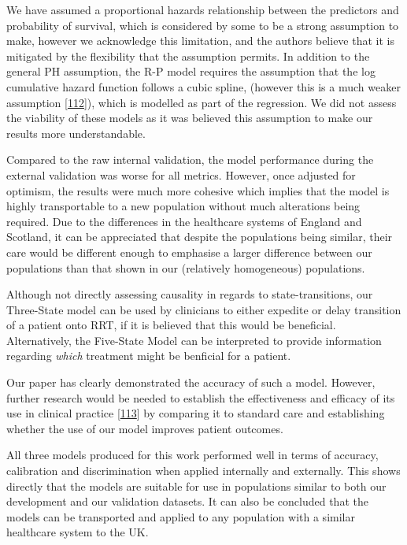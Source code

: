 \documentclass[12pt,PhD,twoside,openright]{muthesis}
\begin{document}
We have assumed a proportional hazards relationship between the predictors and probability of survival, which is considered by some to be a strong assumption to make, however we acknowledge this limitation, and the authors believe that it is mitigated by the flexibility that the assumption permits. In addition to the general PH assumption, the R-P model requires the assumption that the log cumulative hazard function follows a cubic spline, (however this is a much weaker assumption {[}\protect\hyperlink{ref-royston_flexible_2002}{112}{]}), which is modelled as part of the regression. We did not assess the viability of these models as it was believed this assumption to make our results more understandable.

Compared to the raw internal validation, the model performance during the external validation was worse for all metrics. However, once adjusted for optimism, the results were much more cohesive which implies that the model is highly transportable to a new population without much alterations being required. Due to the differences in the healthcare systems of England and Scotland, it can be appreciated that despite the populations being similar, their care would be different enough to emphasise a larger difference between our populations than that shown in our (relatively homogeneous) populations.

Although not directly assessing causality in regards to state-transitions, our Three-State model can be used by clinicians to either expedite or delay transition of a patient onto RRT, if it is believed that this would be beneficial. Alternatively, the Five-State Model can be interpreted to provide information regarding \emph{which} treatment might be benficial for a patient.

Our paper has clearly demonstrated the accuracy of such a model. However, further research would be needed to establish the effectiveness and efficacy of its use in clinical practice {[}\protect\hyperlink{ref-moons_prognosis_2009-1}{113}{]} by comparing it to standard care and establishing whether the use of our model improves patient outcomes.

All three models produced for this work performed well in terms of accuracy, calibration and discrimination when applied internally and externally. This shows directly that the models are suitable for use in populations similar to both our development and our validation datasets. It can also be concluded that the models can be transported and applied to any population with a similar healthcare system to the UK.
\end{document}
